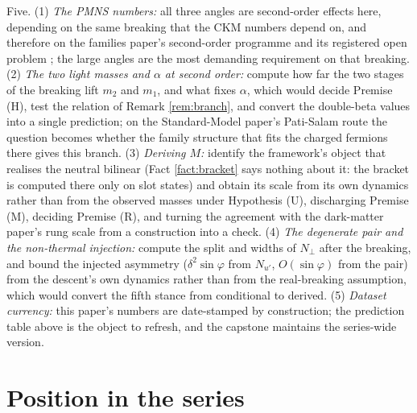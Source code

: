 \documentclass[11pt]{article}
\theoremstyle{definition}
\begin{document}
Five. (1) \emph{The PMNS numbers:} all three angles are second-order effects here, depending on the same breaking that the CKM numbers depend on, and therefore on the families paper's second-order programme and its registered open problem \cite[Prop.~4.3(4), Obs.~7.1]{ButlerT13}; the large angles are the most demanding requirement on that breaking. (2) \emph{The two light masses and $\alpha$ at second order:} compute how far the two stages of the breaking lift $m_{2}$ and $m_{1}$, and what fixes $\alpha$, which would decide Premise (H), test the relation of Remark \ref{rem:branch}, and convert the double-beta values into a single prediction; on the Standard-Model paper's Pati-Salam route the question becomes whether the family structure that fits the charged fermions there gives this branch. (3) \emph{Deriving $M$:} identify the framework's object that realises the neutral bilinear (Fact \ref{fact:bracket} says nothing about it: the bracket is computed there only on slot states) and obtain its scale from its own dynamics rather than from the observed masses under Hypothesis (U), discharging Premise (M), deciding Premise (R), and turning the agreement with the dark-matter paper's rung scale from a construction into a check. (4) \emph{The degenerate pair and the non-thermal injection:} compute the split and widths of $N_{\perp}$ after the breaking, and bound the injected asymmetry ($\delta^{2}\sin\varphi$ from $N_{u'}$, $O(\sin\varphi)$ from the pair) from the descent's own dynamics rather than from the real-breaking assumption, which would convert the fifth stance from conditional to derived. (5) \emph{Dataset currency:} this paper's numbers are date-stamped by construction; the prediction table above is the object to refresh, and the capstone maintains the series-wide version.

\section{Position in the series}\label{sec:position}
\end{document}
